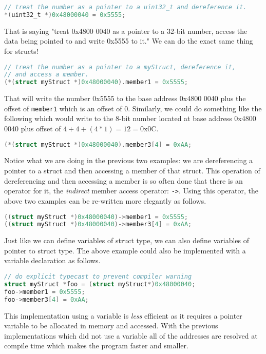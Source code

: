 \begin{lstlisting}[language=C]
// treat the number as a pointer to a uint32_t and dereference it.
*(uint32_t *)0x48000040 = 0x5555;
\end{lstlisting}

That is saying "treat 0x4800 0040 as a pointer to a 32-bit number, access the data being pointed to and write 0x5555 to it." We can do the exact same thing for structs!
\begin{lstlisting}[language=C]
// treat the number as a pointer to a myStruct, dereference it,
// and access a member.
(*(struct myStruct *)0x48000040).member1 = 0x5555;  
\end{lstlisting}

That will write the number 0x5555 to the base address 0x4800 0040 plus the offset of \texttt{member1} which is an offset of 0.
Similarly, we could do something like the following which would write to the 8-bit number located at base address 0x4800 0040 plus offset of $4 + 4 + (4*1) = 12 = \text{0x0C}$. 
\begin{lstlisting}[language=C]
(*(struct myStruct *)0x48000040).member3[4] = 0xAA;  
\end{lstlisting}

Notice what we are doing in the previous two examples: we are dereferencing a pointer to a struct and then accessing a member of that struct.
This operation of dereferencing and then accessing a member is so often done that there is an operator for it, the \emph{indirect} member access operator: \texttt{->}.
Using this operator, the above two examples can be re-written more elegantly as follows.
\begin{lstlisting}[language=C]
((struct myStruct *)0x48000040)->member1 = 0x5555;  
((struct myStruct *)0x48000040)->member3[4] = 0xAA;  
\end{lstlisting}

Just like we can define variables of struct type, we can also define variables of pointer to struct type.
The above example could also be implemented with a variable declaration as follows. 

\begin{lstlisting}[language=C, frame=trBL]
// do explicit typecast to prevent compiler warning
struct myStruct *foo = (struct myStruct*)0x48000040;
foo->member1 = 0x5555;
foo->member3[4] = 0xAA;
\end{lstlisting}

This implementation using a variable is \emph{less} efficient as it requires a pointer variable to be allocated in memory and accessed. With the previous implementations which did not use a variable all of the addresses are resolved at compile time which makes the program faster and smaller. 
